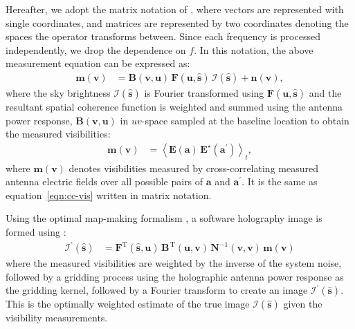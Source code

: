\documentclass[a4paper,fleqn,usenatbib]{mnras}
\begin{document}
Hereafter, we adopt the matrix notation of \citet{mor11}, where vectors are represented with single coordinates, and matrices are represented by two coordinates denoting the spaces the operator transforms between. Since each frequency is processed independently, we drop the dependence on $f$. In this notation, the above measurement equation can be expressed as:
\begin{align}
  \mathbf{m}(\mathbf{v}) &= \mathbf{B}(\mathbf{v},\mathbf{u})\,\mathbf{F}(\mathbf{u},\hat{\mathbf{s}})\,\boldsymbol{\mathcal{I}}(\hat{\mathbf{s}}) + \mathbf{n}(\mathbf{v}),
\end{align}
where the sky brightness $\boldsymbol{\mathcal{I}}(\hat{\mathbf{s}})$ is Fourier transformed using $\mathbf{F}(\mathbf{u},\hat{\mathbf{s}})$ and the resultant spatial coherence function is weighted and summed using the antenna power response, $\mathbf{B}(\mathbf{v},\mathbf{u})$ in $uv$-space sampled at the baseline location to obtain the measured visibilities:
\begin{align}
  \mathbf{m}(\mathbf{v}) &= \left\langle \mathbf{E}(\mathbf{a})\,\mathbf{E}^\star(\mathbf{a}^\prime)\right\rangle_t, \label{eqn:matrix-cc-vis}
\end{align}
where $\mathbf{m}(\mathbf{v})$ denotes visibilities measured by cross-correlating measured antenna electric fields over all possible pairs of $\mathbf{a}$ and $\mathbf{a}^\prime$. It is the same as equation~\ref{eqn:cc-vis} written in matrix notation.

Using the optimal map-making formalism \citep{teg97a,teg97b}, a software holography image is formed using \citep{mor09}:
\begin{align}
  \boldsymbol{\mathcal{I}}^\prime(\hat{\mathbf{s}}) &= \mathbf{F}^\textrm{T}(\hat{\mathbf{s}},\mathbf{u})\,\mathbf{B}^{\,\textrm{T}}(\mathbf{u},\mathbf{v})\,\mathbf{N}^{-1}(\mathbf{v},\mathbf{v})\,\mathbf{m}(\mathbf{v}) \label{eqn:dirty-image-FX}
\end{align}
where the measured visibilities are weighted by the inverse of the system noise, followed by a gridding process using the holographic antenna power response as the gridding kernel, followed by a Fourier transform to create an image $\boldsymbol{\mathcal{I}}^\prime(\hat{\mathbf{s}})$. This is the optimally weighted estimate of the true image $\boldsymbol{\mathcal{I}}(\hat{\mathbf{s}})$ given the visibility measurements.
\end{document}
